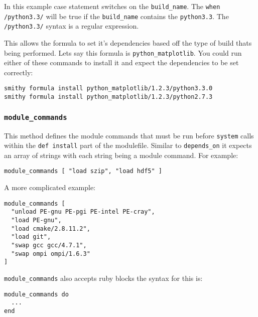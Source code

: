 \documentclass{acm_proc_article-sp}
\begin{document}
In this example case statement switches on the \texttt{build\_name}. The
\texttt{when /python3.3/} will be true if the \texttt{build\_name} contains the
\texttt{python3.3}. The
\texttt{/python3.3/} syntax is a regular expression.

This allows the formula to set it's dependencies based off the type of build
thats being performed. Lets say this formula is \texttt{python\_matplotlib}. You could
run either of these commands to install it and expect the dependencies to be set
correctly:

\begin{quoting}
\begin{verbatim}
smithy formula install python_matplotlib/1.2.3/python3.3.0
smithy formula install python_matplotlib/1.2.3/python2.7.3
\end{verbatim}
\end{quoting}

\subsubsection{\texttt{module\_commands}}

This method defines the module commands that must be run before \texttt{system}
calls within the \texttt{def install} part of the modulefile. Similar to
\texttt{depends\_on} it expects an array of strings with each string being a
module command. For example:

\begin{quoting}
\begin{verbatim}
module_commands [ "load szip", "load hdf5" ]
\end{verbatim}
\end{quoting}

A more complicated example:

\begin{quoting}
\begin{verbatim}
module_commands [
  "unload PE-gnu PE-pgi PE-intel PE-cray",
  "load PE-gnu",
  "load cmake/2.8.11.2",
  "load git",
  "swap gcc gcc/4.7.1",
  "swap ompi ompi/1.6.3"
]
\end{verbatim}
\end{quoting}

\texttt{module\_commands} also accepts ruby blocks the syntax for this is:

\begin{quoting}
\begin{verbatim}
module_commands do
  ...
end
\end{verbatim}
\end{quoting}
\end{document}
